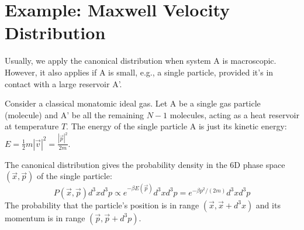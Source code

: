 \documentclass[11pt]{article}
\newcommand{\avg}[1]{\overline{#1}}
\begin{document}
\begin{center}
\end{center}

\section*{Example: Maxwell Velocity Distribution}

Usually, we apply the canonical distribution when system A is macroscopic. However, it also applies if A is small, e.g., a single particle, provided it's in contact with a large reservoir A'.

Consider a classical monatomic ideal gas. Let A be a single gas particle (molecule) and A' be all the remaining $N-1$ molecules, acting as a heat reservoir at temperature $T$.
The energy of the single particle A is just its kinetic energy: $E = \frac{1}{2} m |\vec{v}|^2 = \frac{|\vec{p}|^2}{2m}$.

The canonical distribution gives the probability density in the 6D phase space $(\vec{x}, \vec{p})$ of the single particle:
\[ P(\vec{x}, \vec{p}) d^3x d^3p \propto e^{-\beta E(\vec{p})} d^3x d^3p = e^{-\beta p^2 / (2m)} d^3x d^3p \]
The probability that the particle's position is in range $(\vec{x}, \vec{x}+d^3x)$ and its momentum is in range $(\vec{p}, \vec{p}+d^3p)$.
\end{document}
